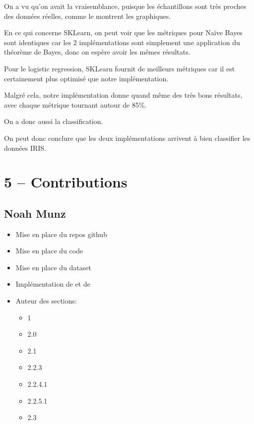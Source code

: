 \documentclass[
]{article}
\providecommand{\tightlist}{%
  \setlength{\itemsep}{0pt}\setlength{\parskip}{0pt}}
\begin{document}
On a vu qu'on avait la vraisemblance, puisque les échantillons sont très
proches des données réelles, comme le montrent les graphiques.

En ce qui concerne SKLearn, on peut voir que les métriques pour Naïve
Bayes sont identiques car les 2 implémentations sont simplement une
application du théorème de Bayes, donc on espère avoir les mêmes
résultats.

Pour le logistic regression, SKLearn fournit de meilleurs métriques car
il est certainement plus optimisé que notre implémentation.

Malgré cela, notre implémentation donne quand même des très bons
résultats, avec chaque métrique tournant autour de 85\%.

On a donc aussi la classification.

On peut donc conclure que les deux implémentations arrivent à bien
classifier les données IRIS.

\newpage{}

\hypertarget{contributions}{%
\section{5 -- Contributions}\label{contributions}}

\hypertarget{noah-munz}{%
\subsection{Noah Munz}\label{noah-munz}}

\begin{itemize}
\tightlist
\item
  Mise en place du repos github
\item
  Mise en place du code
\item
  Mise en place du dataset
\item
  Implémentation de  et de 
\item
  Auteur des sections:

  \begin{itemize}
  \tightlist
  \item
    1
  \item
    2.0
  \item
    2.1
  \item
    2.2.3
  \item
    2.2.4.1
  \item
    2.2.5.1
  \item
    2.3
  \end{itemize}
\end{itemize}
\end{document}
